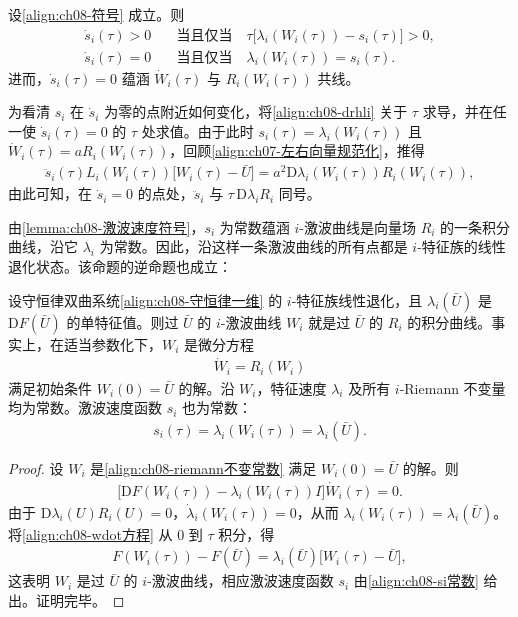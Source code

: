 \documentclass[../../main.tex]{subfiles}
\begin{document}
\begin{lemma}[激波速度沿激波曲线的符号]\label{lemma:ch08-激波速度符号}
设\eqref{align:ch08-符号} 成立。则
\begin{align}
\dot s_i(\tau)>0\quad&\text{当且仅当}\quad \tau\big[\lambda_i(W_i(\tau))-s_i(\tau)\big]>0,
\label{align:ch08-sdotpos}\\
\dot s_i(\tau)=0\quad&\text{当且仅当}\quad \lambda_i(W_i(\tau))=s_i(\tau).
\label{align:ch08-sdotzero}
\end{align}
进而，$\dot s_i(\tau)=0$ 蕴涵 $\dot W_i(\tau)$ 与 $R_i(W_i(\tau))$ 共线。
\end{lemma}

为看清 $s_i$ 在 $\dot s_i$ 为零的点附近如何变化，将\eqref{align:ch08-drhli} 关于 $\tau$ 求导，并在任一使 $\dot s_i(\tau)=0$ 的 $\tau$ 处求值。由于此时 $s_i(\tau)=\lambda_i(W_i(\tau))$ 且 $\dot W_i(\tau)=aR_i(W_i(\tau))$，回顾\eqref{align:ch07-左右向量规范化}，推得
\begin{align}
\ddot s_i(\tau)L_i(W_i(\tau))\big[W_i(\tau)-\bar U\big]
=a^2\mathrm{D}\lambda_i(W_i(\tau))R_i(W_i(\tau)),
\label{align:ch08-sddot}
\end{align}
由此可知，在 $\dot s_i=0$ 的点处，$\ddot s_i$ 与 $\tau\,\mathrm{D}\lambda_i R_i$ 同号。

由\cref{lemma:ch08-激波速度符号}，$s_i$ 为常数蕴涵 $i$-激波曲线是向量场 $R_i$ 的一条积分曲线，沿它 $\lambda_i$ 为常数。因此，沿这样一条激波曲线的所有点都是 $i$-特征族的线性退化状态。该命题的逆命题也成立：

\begin{theorem}[线性退化族的激波曲线]\label{theorem:ch08-线性退化激波曲线}
设守恒律双曲系统\eqref{align:ch08-守恒律一维} 的 $i$-特征族线性退化，且 $\lambda_i(\bar U)$ 是 $\mathrm{D}F(\bar U)$ 的单特征值。则过 $\bar U$ 的 $i$-激波曲线 $W_i$ 就是过 $\bar U$ 的 $R_i$ 的积分曲线。事实上，在适当参数化下，$W_i$ 是微分方程
\begin{align}
\dot W_i=R_i(W_i)
\label{align:ch08-riemann不变常数}
\end{align}
满足初始条件 $W_i(0)=\bar U$ 的解。沿 $W_i$，特征速度 $\lambda_i$ 及所有 $i$-Riemann 不变量均为常数。激波速度函数 $s_i$ 也为常数：
\begin{align}
s_i(\tau)=\lambda_i(W_i(\tau))=\lambda_i(\bar U).
\label{align:ch08-si常数}
\end{align}
\end{theorem}

\begin{proof}
设 $W_i$ 是\eqref{align:ch08-riemann不变常数} 满足 $W_i(0)=\bar U$ 的解。则
\begin{align}
\big[\mathrm{D}F(W_i(\tau))-\lambda_i(W_i(\tau))I\big]\dot W_i(\tau)=0.
\label{align:ch08-wdot方程}
\end{align}
由于 $\mathrm{D}\lambda_i(U)R_i(U)=0$，$\dot\lambda_i(W_i(\tau))=0$，从而 $\lambda_i(W_i(\tau))=\lambda_i(\bar U)$。将\eqref{align:ch08-wdot方程} 从 $0$ 到 $\tau$ 积分，得
\begin{align}
F(W_i(\tau))-F(\bar U)=\lambda_i(\bar U)\big[W_i(\tau)-\bar U\big],
\label{align:ch08-积分rh}
\end{align}
这表明 $W_i$ 是过 $\bar U$ 的 $i$-激波曲线，相应激波速度函数 $s_i$ 由\eqref{align:ch08-si常数} 给出。证明完毕。
\end{proof}
\end{document}
